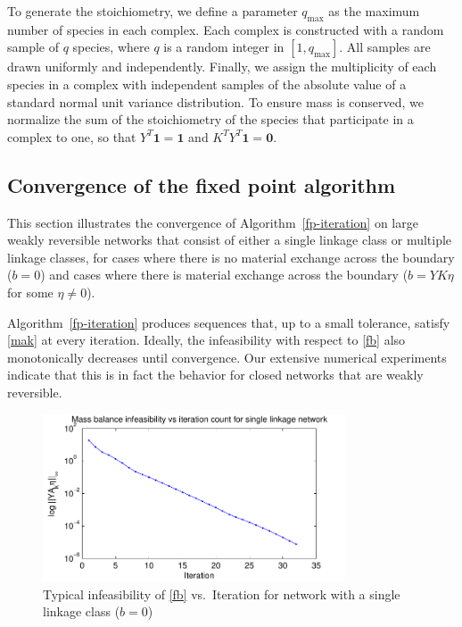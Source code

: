 \documentclass[smallextended]{svjour3}       %
\newcommand*{\0}{\mathbf{0}}
\newcommand*{\1}{\mathbf{1}}
\begin{document}
To generate the stoichiometry, we define a parameter $q_{\max}$ as the maximum 
number of species in each complex. Each complex is constructed with a random
sample of $q$ species, where $q$ is a random integer in $[1,q_{\max}]$.  All samples
are drawn uniformly and independently.  Finally, we assign the multiplicity of
each species in a complex with independent samples of the absolute value of a
standard normal unit variance distribution. To ensure mass is conserved, we
normalize the sum of the stoichiometry of the species that participate in a
complex to one, so that $Y^T\1 = \1$ and $K^TY^T \1 = \0$. 

\subsection{Convergence of the fixed point algorithm}
\label{scn:convergence} 

This section illustrates the convergence of Algorithm~\ref{fp-iteration} on
large weakly reversible networks that consist of either a single linkage class 
or multiple linkage classes, for cases where there is no material exchange
across the boundary ($b=0$) and cases where there is material exchange
across the boundary ($b=YK\eta$ for some $\eta \neq 0$).

Algorithm~\ref{fp-iteration} produces sequences that, up to a small tolerance,
satisfy \eqref{mak} at every iteration. Ideally, the infeasibility with 
respect to \eqref{fb} also monotonically decreases until convergence.  Our
extensive numerical experiments indicate that this is in fact the behavior for
closed networks that are weakly reversible.

\begin{figure}%
   \centering 
   \includegraphics[width=0.8\textwidth]{InfeasibilityVsIteration}
   \caption{Typical infeasibility of \eqref{fb} vs.\ Iteration for network with a
            single linkage class ($b=0$)} 
   \label{fig:typical-infeas-single} 
\end{figure}
\end{document}
